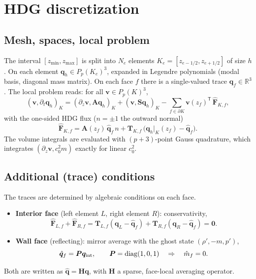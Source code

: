 \documentclass[11pt,a4paper]{article}
\newcommand{\qh}{\hat{\bm q}}
\newcommand{\q}{\bm q}
\begin{document}
\section{HDG discretization}
\subsection{Mesh, spaces, local problem}
The interval $[z_{\min},z_{\max}]$ is split into $N_e$ elements $K_e=[z_{e-1/2},z_{e+1/2}]$ of size
$h$. On each element $\q_h\in P_p(K_e)^3$, expanded in Legendre polynomials (modal basis, diagonal
mass matrix). On each face $f$ there is a single-valued trace $\qh_f\in\mathbb R^3$. The local
problem reads: for all $\bm v\in P_p(K)^3$,
\begin{equation}\label{eq:local}
(\bm v,\partial_t\q_h)_K = (\partial_z\bm v,\bm A\q_h)_K + (\bm v,\bm S\q_h)_K
 - \sum_{f\in\partial K}\bm v(z_f)^{\mathsf T}\,\widehat{\bm F}_{K,f},
\end{equation}
with the one-sided HDG flux ($n=\pm1$ the outward normal)
\begin{equation}\label{eq:hdgflux}
\widehat{\bm F}_{K,f} = \bm A(z_f)\,\qh_f\,n + \bm T_{K,f}\,\big(\q_h|_K(z_f)-\qh_f\big).
\end{equation}
The volume integrals are evaluated with $(p+3)$-point Gauss quadrature, which integrates
$(\partial_z\bm v, c_0^2 m)$ exactly for linear $c_0^2$.

\subsection{Additional (trace) conditions}
The traces are determined by algebraic conditions on each face.
\begin{itemize}
\item \textbf{Interior face} (left element $L$, right element $R$): conservativity,
\begin{equation}\label{eq:cons}
\widehat{\bm F}_{L,f}+\widehat{\bm F}_{R,f}=
\bm T_{L,f}(\q_L-\qh_f)+\bm T_{R,f}(\q_R-\qh_f)=\bm 0 .
\end{equation}
\item \textbf{Wall face} (reflecting): mirror average with the ghost state $(\rho',-m,p')$,
\begin{equation}\label{eq:wall}
\qh_f = \bm P\q_{\rm int},\qquad \bm P=\operatorname{diag}(1,0,1)\quad\Rightarrow\quad \hat m_f=0 .
\end{equation}
\end{itemize}
Both are written as $\qh = \bm H\q$, with $\bm H$ a sparse, face-local averaging operator.
\end{document}
